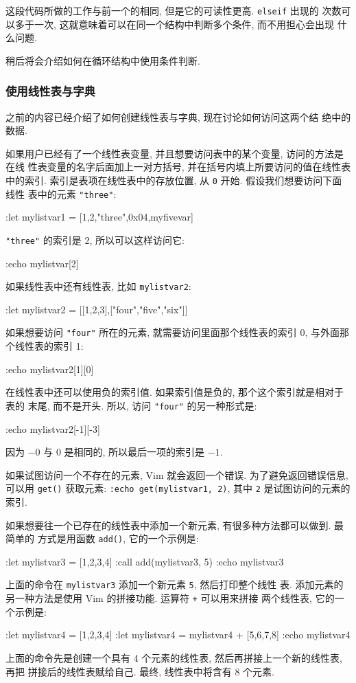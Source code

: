 这段代码所做的工作与前一个的相同, 但是它的可读性更高. \texttt{elseif} 出现的
次数可以多于一次, 这就意味着可以在同一个结构中判断多个条件, 而不用担心会出现
什么问题.

稍后将会介绍如何在循环结构中使用条件判断.

\subsubsection{使用线性表与字典}
\label{subsubsec:working_with_lists_and_dictionaries}

之前的内容已经介绍了如何创建线性表与字典, 现在讨论如何访问这两个结
绝中的数据.

如果用户已经有了一个线性表变量, 并且想要访问表中的某个变量, 访问的方法是在线
性表变量的名字后面加上一对方括号, 并在括号内填上所要访问的值在线性表中的索引.
索引是表项在线性表中的存放位置, 从 \texttt{0} 开始. 假设我们想要访问下面线性
表中的元素 \texttt{"three"}:
\begin{vimcode}
:let mylistvar1 = [1,2,"three",0x04,myfivevar]
\end{vimcode}
\texttt{"three"} 的索引是 2, 所以可以这样访问它:
\begin{vimcode}
:echo mylistvar[2]
\end{vimcode}
如果线性表中还有线性表, 比如 \texttt{mylistvar2}:
\begin{vimcode}
:let mylistvar2 = [[1,2,3],["four","five","six"]]
\end{vimcode}
如果想要访问 \texttt{"four"} 所在的元素, 就需要访问里面那个线性表的索引 0,
与外面那个线性表的索引 1:
\begin{vimcode}
:echo mylistvar2[1][0]
\end{vimcode}

在线性表中还可以使用负的索引值. 如果索引值是负的, 那个这个索引就是相对于表的
末尾, 而不是开头. 所以, 访问 \texttt{"four"} 的另一种形式是:
\begin{vimcode}
:echo mylistvar2[-1][-3]
\end{vimcode}
因为 $-0$ 与 $0$ 是相同的, 所以最后一项的索引是 $-1$.

\begin{warning}
    如果试图访问一个不存在的元素, Vim 就会返回一个错误. 为了避免返回错误信息,
    可以用 \texttt{get()} 获取元素: \texttt{:echo get(mylistvar1, 2)}, 其中
    \texttt{2} 是试图访问的元素的索引.
\end{warning}

如果想要往一个已存在的线性表中添加一个新元素, 有很多种方法都可以做到. 最简单的
方式是用函数 \texttt{add()}, 它的一个示例是:
\begin{vimcode}
:let mylistvar3 = [1,2,3,4]
:call add(mylistvar3, 5)
:echo mylistvar3
\end{vimcode}
上面的命令在 \texttt{mylistvar3} 添加一个新元素 \texttt{5}, 然后打印整个线性
表. 添加元素的另一种方法是使用 Vim 的拼接功能. 运算符 \texttt{+} 可以用来拼接
两个线性表, 它的一个示例是:
\begin{vimcode}
:let mylistvar4 = [1,2,3,4]
:let mylistvar4 = mylistvar4 + [5,6,7,8]
:echo mylistvar4
\end{vimcode}
上面的命令先是创建一个具有 4 个元素的线性表, 然后再拼接上一个新的线性表, 再把
拼接后的线性表赋给自己. 最终, 线性表中将含有 8 个元素.


